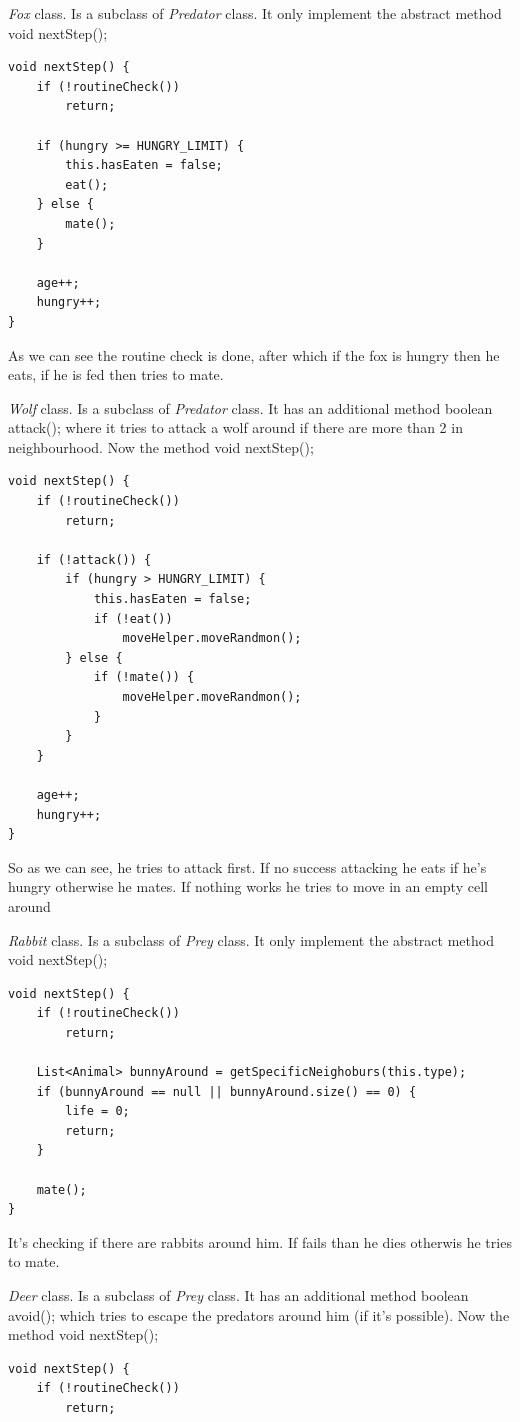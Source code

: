 \documentclass[11pt]{article}
\begin{document}
\begin{description}
\item
\emph{Fox} class. Is a subclass of \emph{Predator} class. It only implement the abstract method {\ttfamily void nextStep();}
\begin{lstlisting}
void nextStep() {
	if (!routineCheck())
		return;
	
	if (hungry >= HUNGRY_LIMIT) {
		this.hasEaten = false;
		eat();
	} else {
		mate();
	}
	
	age++;
	hungry++;
}
\end{lstlisting}
As we can see the routine check is done, after which if the fox is hungry then he eats, if he is fed then tries to mate.

\item
\emph{Wolf} class. Is a subclass of \emph{Predator} class. It has an additional method {\ttfamily boolean attack();} where it tries to attack a wolf around if there are more than 2 in neighbourhood. Now the method {\ttfamily void nextStep();}
\begin{lstlisting}
void nextStep() {
	if (!routineCheck())
		return;
	
	if (!attack()) {
		if (hungry > HUNGRY_LIMIT) {
			this.hasEaten = false;
			if (!eat())
				moveHelper.moveRandmon();
		} else {
			if (!mate()) {
				moveHelper.moveRandmon();
			}
		}
	}
	
	age++;
	hungry++;
}
\end{lstlisting}
So as we can see, he tries to attack first. If no success attacking he eats if he's hungry otherwise he mates. If nothing works he tries to move in an empty cell around

\item
\emph{Rabbit} class. Is a subclass of \emph{Prey} class. It only implement the abstract method {\ttfamily void nextStep();}
\begin{lstlisting}
void nextStep() {
	if (!routineCheck())
		return;
	
	List<Animal> bunnyAround = getSpecificNeighoburs(this.type);
	if (bunnyAround == null || bunnyAround.size() == 0) {
		life = 0;
		return;
	}
	
	mate();
}
\end{lstlisting}
It's checking if there are rabbits around him. If fails than he dies otherwis he tries to mate.

\item
\emph{Deer} class. Is a subclass of \emph{Prey} class. It has an additional method {\ttfamily boolean avoid();} which tries to escape the predators around him (if it's possible). Now the method {\ttfamily void nextStep();}
\begin{lstlisting}
void nextStep() {
	if (!routineCheck())
		return;
	

\end{lstlisting}
\end{description}
\end{document}
